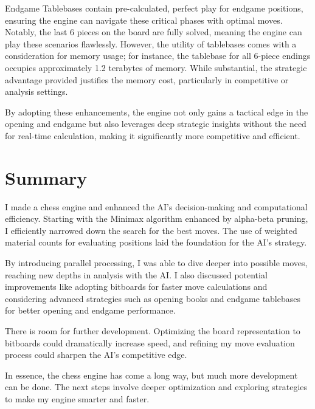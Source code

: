 \documentclass{article}
\begin{document}
Endgame Tablebases contain pre-calculated, perfect play for endgame positions, ensuring the engine can navigate these critical phases with optimal moves. Notably, the last 6 pieces on the board are fully solved, meaning the engine can play these scenarios flawlessly. However, the utility of tablebases comes with a consideration for memory usage; for instance, the tablebase for all 6-piece endings occupies approximately 1.2 terabytes of memory. While substantial, the strategic advantage provided justifies the memory cost, particularly in competitive or analysis settings.

By adopting these enhancements, the engine not only gains a tactical edge in the opening and endgame but also leverages deep strategic insights without the need for real-time calculation, making it significantly more competitive and efficient.



\section{Summary}

I made a chess engine and enhanced the AI's decision-making and computational efficiency. Starting with the Minimax algorithm enhanced by alpha-beta pruning, I efficiently narrowed down the search for the best moves. The use of weighted material counts for evaluating positions laid the foundation for the AI's strategy.

By introducing parallel processing, I was able to dive deeper into possible moves, reaching new depths in analysis with the AI. I also discussed potential improvements like adopting bitboards for faster move calculations and considering advanced strategies such as opening books and endgame tablebases for better opening and endgame performance.

There is room for further development. Optimizing the board representation to bitboards could dramatically increase speed, and refining my move evaluation process could sharpen the AI's competitive edge.

In essence, the chess engine has come a long way, but much more development can be done. The next steps involve deeper optimization and exploring strategies to make my engine smarter and faster.
\end{document}
